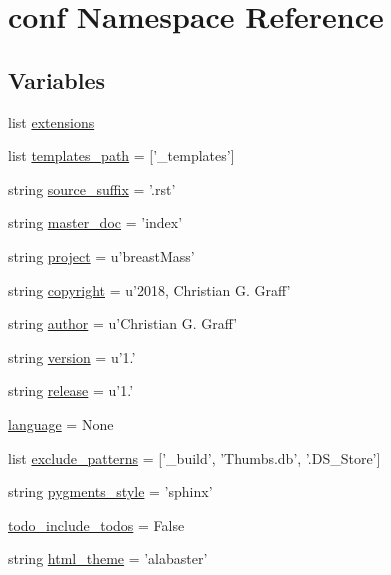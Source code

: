 \hypertarget{namespaceconf}{\section{conf Namespace Reference}
\label{namespaceconf}
}
\subsection*{Variables}
\begin{DoxyCompactItemize}
\item 
list \hyperlink{namespaceconf_ae475e080536acb271a0a0efe56c3ba42}{extensions}
\item 
list \hyperlink{namespaceconf_ae850ae634911b713e036b43894fdd525}{templates\-\_\-path} = \mbox{[}'\-\_\-templates'\mbox{]}
\item 
string \hyperlink{namespaceconf_a10af2a769eb3bd3322e874f677e435b1}{source\-\_\-suffix} = '.rst'
\item 
string \hyperlink{namespaceconf_a6fcd7e5236f355b1e1a55f9d95988810}{master\-\_\-doc} = 'index'
\item 
string \hyperlink{namespaceconf_a45653c983098153b78e33600e39230eb}{project} = u'breast\-Mass'
\item 
string \hyperlink{namespaceconf_a33fa97cf51dcb25970fbf53f10159589}{copyright} = u'2018, Christian G. Graff'
\item 
string \hyperlink{namespaceconf_a637c239d256432248aa8d9f3ab0b8c52}{author} = u'Christian G. Graff'
\item 
string \hyperlink{namespaceconf_ade15c5b54093b64d7c428ec19ca5b1cb}{version} = u'1.'
\item 
string \hyperlink{namespaceconf_a325dc746d8bf05c54d26351c35a21d90}{release} = u'1.'
\item 
\hyperlink{namespaceconf_ad76a2e6d7bfa880ebb4042c08e8b4e12}{language} = None
\item 
list \hyperlink{namespaceconf_a7ad48fb6f3e9b129c02346ea0d3527c1}{exclude\-\_\-patterns} = \mbox{[}'\-\_\-build', 'Thumbs.\-db', '.D\-S\-\_\-\-Store'\mbox{]}
\item 
string \hyperlink{namespaceconf_a641130e096b26cba8a5d63ed38684de7}{pygments\-\_\-style} = 'sphinx'
\item 
\hyperlink{namespaceconf_a997cbdffcb2f28023aba4c37bbf469b5}{todo\-\_\-include\-\_\-todos} = False
\item 
string \hyperlink{namespaceconf_a6c3bfcc1a44546c1c75ce20f55bd0fd6}{html\-\_\-theme} = 'alabaster'
\item 

\end{DoxyCompactItemize}
